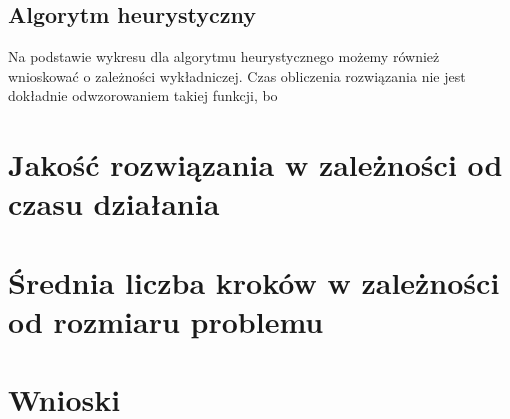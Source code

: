 \documentclass[a4paper,10pt]{article}
\begin{document}
\subsection{Algorytm heurystyczny}
Na podstawie wykresu dla algorytmu heurystycznego możemy również wnioskować o zależności wykładniczej.
Czas obliczenia rozwiązania nie jest dokładnie odwzorowaniem takiej funkcji, bo 
\begin{center} 

\end{center}

%

\section{Jakość rozwiązania w zależności od czasu działania}
\begin{center}

\end{center}
\begin{center}

\end{center}

\section{Średnia liczba kroków w zależności od rozmiaru problemu}
\begin{center}

\end{center}

\section{Wnioski}
\end{document}
